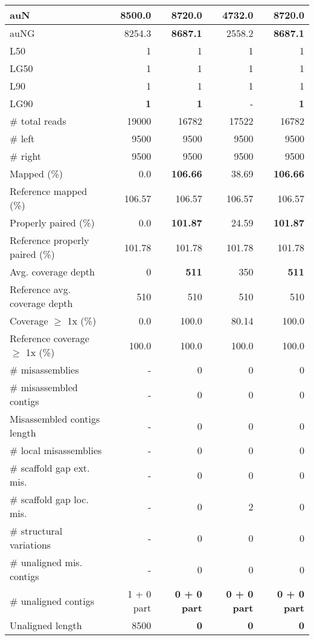 \documentclass[12pt,a4paper]{article}
\begin{document}
\begin{table}[ht]
\begin{center}
\begin{tabular}{|l*{4}{|r}|}
auN & 8500.0 & {\bf 8720.0} & 4732.0 & {\bf 8720.0} \\ \hline
auNG & 8254.3 & {\bf 8687.1} & 2558.2 & {\bf 8687.1} \\ \hline
L50 & 1 & 1 & 1 & 1 \\ \hline
LG50 & 1 & 1 & 1 & 1 \\ \hline
L90 & 1 & 1 & 1 & 1 \\ \hline
LG90 & {\bf 1} & {\bf 1} & - & {\bf 1} \\ \hline
\# total reads & 19000 & 16782 & 17522 & 16782 \\ \hline
\# left & 9500 & 9500 & 9500 & 9500 \\ \hline
\# right & 9500 & 9500 & 9500 & 9500 \\ \hline
Mapped (\%) & 0.0 & {\bf 106.66} & 38.69 & {\bf 106.66} \\ \hline
Reference mapped (\%) & 106.57 & 106.57 & 106.57 & 106.57 \\ \hline
Properly paired (\%) & 0.0 & {\bf 101.87} & 24.59 & {\bf 101.87} \\ \hline
Reference properly paired (\%) & 101.78 & 101.78 & 101.78 & 101.78 \\ \hline
Avg. coverage depth & 0 & {\bf 511} & 350 & {\bf 511} \\ \hline
Reference avg. coverage depth & 510 & 510 & 510 & 510 \\ \hline
Coverage $\geq$ 1x (\%) & 0.0 & 100.0 & 80.14 & 100.0 \\ \hline
Reference coverage $\geq$ 1x (\%) & 100.0 & 100.0 & 100.0 & 100.0 \\ \hline
\# misassemblies & - & 0 & 0 & 0 \\ \hline
\# misassembled contigs & - & 0 & 0 & 0 \\ \hline
Misassembled contigs length & - & 0 & 0 & 0 \\ \hline
\# local misassemblies & - & 0 & 0 & 0 \\ \hline
\# scaffold gap ext. mis. & - & 0 & 0 & 0 \\ \hline
\# scaffold gap loc. mis. & - & 0 & 2 & 0 \\ \hline
\# structural variations & - & 0 & 0 & 0 \\ \hline
\# unaligned mis. contigs & - & 0 & 0 & 0 \\ \hline
\# unaligned contigs & 1 + 0 part & {\bf 0 + 0 part} & {\bf 0 + 0 part} & {\bf 0 + 0 part} \\ \hline
Unaligned length & 8500 & {\bf 0} & {\bf 0} & {\bf 0} \\ \hline

\end{tabular}
\end{center}
\end{table}
\end{document}

